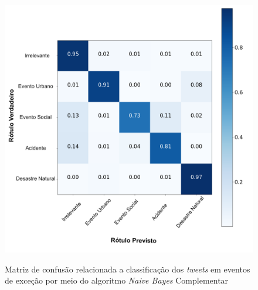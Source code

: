 \documentclass[
	12pt,				%
	oneside,			%
	a4paper,			%
	english,			%
	brazil				%
	]{abntex2ppgsi}
\begin{document}
{{{\begin{apendicesenv}
\begin{figure}[!htb]
	\centering
 	  \caption{Matriz de confusão relacionada a classificação dos \textit{tweets} em eventos de exceção por meio do algoritmo \textit{Naive Bayes} Complementar}
		\includegraphics[width=1\linewidth]{images/confusion_matrix_cnb_pt.png}
	\label{fig:confusion_matrix_gnb}
\end{figure}


\end{apendicesenv}}}}
\end{document}

